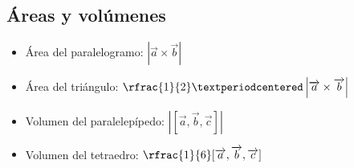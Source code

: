 \subsection{Áreas y volúmenes}
\begin{itemize}
  \item Área del paralelogramo: $\left|\vec{a}\times\vec{b}\right|$
  \item Área del triángulo: $\rfrac{1}{2}·\left|\vec{a}\times\vec{b}\right|$
  \item Volumen del paralelepípedo: $\left|[\vec{a},\vec{b},\vec{c}]\right|$
  \item Volumen del tetraedro: $\rfrac{1}{6}[\vec{a},\vec{b},\vec{c}]$
\end{itemize}
